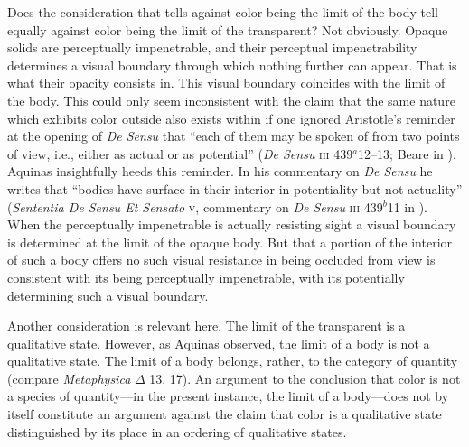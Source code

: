\label{actual_potential} Does the consideration that tells against color being the limit of the body tell equally against color being the limit of the transparent? Not obviously. Opaque solids are perceptually impenetrable, and their perceptual impenetrability determines a visual boundary through which nothing further can appear. That is what their opacity consists in. This visual boundary coincides with the limit of the body. This could only seem inconsistent with the claim that the same nature which exhibits color outside also exists within if one ignored Aristotle's reminder at the opening of \emph{De Sensu} that ``each of them may be spoken of from two points of view, i.e., either as actual or as potential'' (\emph{De Sensu} \textsc{iii} 439\( ^{a} \)12--13; Beare in \citealt[7]{Barnes:1984uq}). Aquinas insightfully heeds this reminder. In his commentary on \emph{De Sensu} he writes that ``bodies have surface in their interior in potentiality but not actuality'' (\emph{Sententia De Sensu Et Sensato} \textsc{v}, commentary on \emph{De Sensu} \textsc{iii} 439\( ^{b} \)11 in \citealt{White:2005vn}). When the perceptually impenetrable is actually resisting sight a visual boundary is determined at the limit of the opaque body. But that a portion of the interior of such a body offers no such visual resistance in being occluded from view is consistent with its being perceptually impenetrable, with its potentially determining such a visual boundary.

Another consideration is relevant here. The limit of the transparent is a qualitative state. However, as Aquinas observed, the limit of a body is not a qualitative state. The limit of a body belongs, rather, to the category of quantity (compare \emph{Metaphysica} \( \Delta \) 13, 17). An argument to the conclusion that color is not a species of quantity---in the present instance, the limit of a body---does not by itself constitute an argument against the claim that color is a qualitative state distinguished by its place in an ordering of qualitative states.

